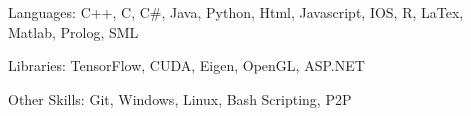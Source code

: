 

\begin{cvskills}

  \cvskill
    {Languages:} %
    {C++, C, C\#, Java, Python, Html, Javascript, IOS, R, LaTex, Matlab, Prolog, SML} %

  \cvskill
    {Libraries:} %
    {TensorFlow, CUDA, Eigen, OpenGL, ASP.NET} %

  \cvskill
    {Other Skills:} %
    {Git, Windows, Linux, Bash Scripting, P2P} %

\end{cvskills}
